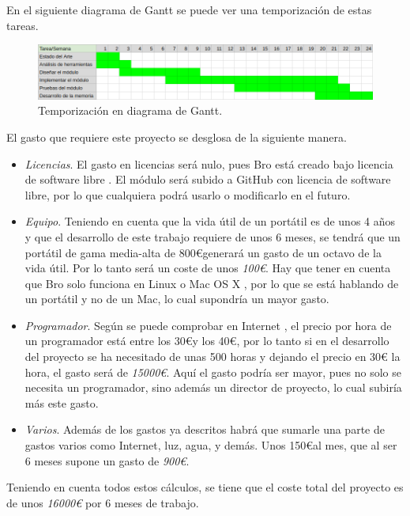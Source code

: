 \intro En el siguiente diagrama de Gantt se puede ver una temporización de estas tareas. 

\begin{figure}[H]
  \includegraphics[width=1\textwidth]{imagenes/temporizacion.png} 
  \centering
  \caption{Temporización en diagrama de Gantt.}
\end{figure}

El gasto que requiere este proyecto se desglosa de la siguiente manera.
\begin{itemize}
\item \textit{Licencias}. El gasto en licencias será nulo, pues Bro está creado bajo licencia de software libre \cite{broindex}. El 
módulo será subido a GitHub \cite{repo} con licencia de software libre, por lo que cualquiera podrá usarlo o modificarlo en el futuro.
\item \textit{Equipo}. Teniendo en cuenta que la vida útil de un portátil es de unos 4 años y que el desarrollo de este trabajo 
requiere de unos 6 meses, se tendrá que un portátil de gama media-alta de 800\euro generará un gasto de un octavo de la vida útil. Por 
lo tanto será un coste de unos \textit{100\euro}. Hay que tener en cuenta que Bro solo funciona en Linux o Mac OS X 
\cite{brodownload}, por lo que se está hablando de un portátil y no de un Mac, lo cual supondría un mayor gasto.
\item \textit{Programador}. Según se puede comprobar en Internet \cite{tarifa}, el precio por hora de un programador está entre los 
30\euro y los 40\euro, por lo tanto si en el desarrollo del proyecto se ha necesitado de unas 500 horas y dejando el precio en 30\euro 
la hora, el gasto será de \textit{15000\euro}. Aquí el gasto podría ser mayor, pues no solo se necesita un programador, sino además un 
director de proyecto, lo cual subiría más este gasto.
\item \textit{Varios}. Además de los gastos ya descritos habrá que sumarle una parte de gastos varios como Internet, luz, agua, y 
demás. Unos 150\euro al mes, que al ser 6 meses supone un gasto de \textit{900\euro}.
\end{itemize}

\intro Teniendo en cuenta todos estos cálculos, se tiene que el coste total del proyecto es de unos \textit{16000\euro} por 6 meses de 
trabajo.


